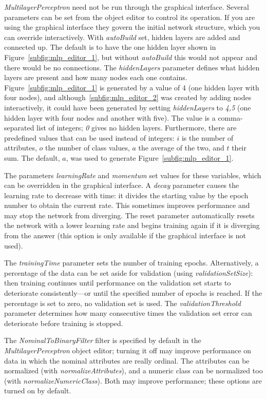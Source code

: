 \textit{MultilayerPerceptron} need not be run through the graphical
interface. Several parameters can be set from the object editor to
control its operation. If you are using the graphical interface they
govern the initial network structure, which you can override
interactively. With \textit{autoBuild} set, hidden layers are added
and connected up. The default is to have the one hidden layer shown in
Figure~\ref{subfig:mlp_editor_1}, but without \textit{autoBuild} this
would not appear and there would be no connections. The
\textit{hiddenLayers} parameter defines what hidden layers are present
and how many nodes each one contains. Figure~\ref{subfig:mlp_editor_1}
is generated by a value of 4 (one hidden layer with four nodes), and
although~\ref{subfig:mlp_editor_2} was created by adding nodes
interactively, it could have been generated by setting
\textit{hiddenLayers} to \textit{4,5} (one hidden layer with four
nodes and another with five). The value is a comma-separated list of
integers; \textit{0} gives no hidden layers. Furthermore, there are
predefined values that can be used instead of integers: $i$ is the
number of attributes, $o$ the number of class values, $a$ the average
of the two, and $t$ their sum. The default, $a$, was used to generate
Figure~\ref{subfig:mlp_editor_1}.

The parameters \textit{learningRate} and \textit{momentum} set values
for these variables, which can be overridden in the graphical
interface. A \textit{decay} parameter causes the learning rate to
decrease with time: it divides the starting value by the epoch number
to obtain the current rate. This sometimes improves performance and
may stop the network from diverging. The reset parameter automatically
resets the network with a lower learning rate and begins training
again if it is diverging from the answer (this option is only
available if the graphical interface is not used).

The \textit{trainingTime} parameter sets the number of training
epochs. Alternatively, a percentage of the data can be set aside for
validation (using \textit{validationSetSize}): then training continues
until performance on the validation set starts to deteriorate
consistently---or until the specified number of epochs is reached. If
the percentage is set to zero, no validation set is used. The
\textit{validationThreshold} parameter determines how many consecutive
times the validation set error can deteriorate before training is
stopped.

The \textit{NominalToBinaryFilter} filter is specified by default in
the \textit{MultilayerPerceptron} object editor; turning it off may
improve performance on data in which the nominal attributes are really
ordinal. The attributes can be normalized (with
\textit{normalizeAttributes}), and a numeric class can be normalized
too (with \textit{normalizeNumericClass}). Both may improve
performance; these options are turned on by default.

